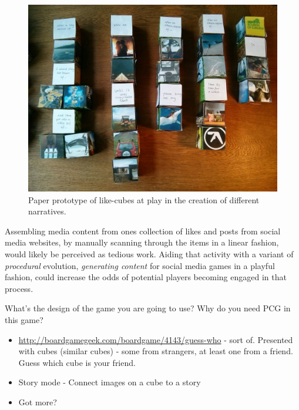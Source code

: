 \documentclass[]{article}
\begin{document}
\begin{figure}[h!]
	\centerline{\includegraphics[width=\textwidth]{IMG_20141029_110139.jpg}}
	\caption{Paper prototype of like-cubes at play in the creation of different narratives.}
	\label{fig:narratives}
\end{figure}

Assembling media content from ones collection of likes and posts from social media websites, by manually scanning through the items in a linear fashion, would likely be perceived as tedious work.  Aiding that activity with a variant of \textit{procedural} evolution, \textit{generating content} for social media games in a playful fashion, could increase the odds of potential players becoming engaged in that process.


\begin{framed}
What’s the design of the game you are going to use? Why do you need PCG in this game?
\end{framed}
\begin{itemize}
\item \href{Guess who}{http://boardgamegeek.com/boardgame/4143/guess-who} - sort of. Presented with cubes (similar cubes) - some from strangers, at least one from a friend. Guess which cube is your friend.
\item Story mode - Connect images on a cube to a story
\item Got more?
\end{itemize}

\end{document}
